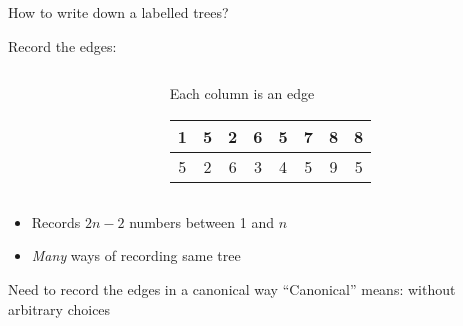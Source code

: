 \documentclass{beamer}
\begin{document}
\begin{frame}{How to write down a labelled trees?}
  \begin{block}{Record the edges:}
    \begin{columns}
      \begin{column}{.3\textwidth}
\begin{center}
\end{center}      
      \end{column}
      \begin{column}{.7\textwidth}
        \begin{center}
          Each column is an edge \\
        \begin{tabular}{c|c|c|c|c|c|c|c}
        1 & 5 & 2 & 6 & 5 & 7 & 8 & 8 \\ \hline
        5 & 2 & 6 & 3 & 4 & 5 & 9 & 5
        \end{tabular}
\end{center}
\end{column}
    \end{columns}

      \end{block}

  \begin{itemize}
  \item Records $2n-2$ numbers between 1 and $n$
  \item \emph{Many} ways of recording same tree
  \end{itemize}

  \begin{block}{Need to record the edges in a canonical way}
``Canonical'' means: without arbitrary choices
    \end{block}

\end{frame}
\end{document}

